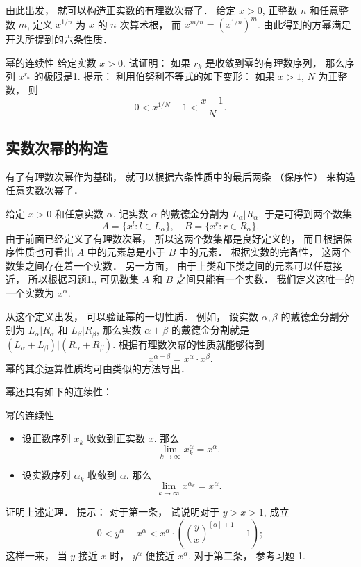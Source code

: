由此出发， 就可以构造正实数的有理数次幂了． 给定 $x>0$, 正整数 $n$ 和任意整数 $m$, 定义 $x^{1/n}$ 为 $x$ 的 $n$ 次算术根， 而 $x^{m/n}=(x^{1/n})^m$. 由此得到的方幂满足开头所提到的六条性质．

\begin{exercise}{幂的连续性}
给定实数 $x>0$. 试证明： 如果 $r_k$ 是收敛到零的有理数序列， 那么序列 $x^{r_k}$ 的极限是1. 提示： 利用伯努利不等式的如下变形： 如果 $x>1$, $N$ 为正整数， 则
\[
0<x^{1/N}-1<\frac{x-1}{N}.
\]
\end{exercise}

\subsection{实数次幂的构造}
有了有理数次幂作为基础， 就可以根据六条性质中的最后两条 （保序性） 来构造任意实数次幂了． 

给定 $x>0$ 和任意实数 $\alpha$. 记实数 $\alpha$ 的戴德金分割为 $L_\alpha|R_\alpha$. 于是可得到两个数集
\[
A=\{x^l:l\in L_\alpha\},\quad B=\{x^r:r\in R_\alpha\}.
\]
由于前面已经定义了有理数次幂， 所以这两个数集都是良好定义的， 而且根据保序性质也可看出 $A$ 中的元素总是小于 $B$ 中的元素． 根据实数的完备性， 这两个数集之间存在着一个实数． 另一方面， 由于上类和下类之间的元素可以任意接近， 所以根据习题1., 可见数集 $A$ 和 $B$ 之间只能有一个实数． 我们定义这唯一的一个实数为 $x^\alpha$.

从这个定义出发， 可以验证幂的一切性质． 例如， 设实数 $\alpha,\beta$ 的戴德金分割分别为 $L_\alpha|R_\alpha$ 和 $L_\beta|R_\beta$, 那么实数 $\alpha+\beta$ 的戴德金分割就是 $(L_\alpha+L_\beta)|(R_\alpha+R_\beta)$. 根据有理数次幂的性质就能够得到
\[
x^{\alpha+\beta}=x^\alpha\cdot x^\beta.
\]
幂的其余运算性质均可由类似的方法导出．

幂还具有如下的连续性：

\begin{theorem}{幂的连续性}
\begin{itemize}
\item 设正数序列 $x_k$ 收敛到正实数 $x$. 那么
\[
\lim_{k\to\infty}x_k^\alpha=x^\alpha.
\]
\item 设实数序列 $\alpha_k$ 收敛到 $\alpha$. 那么
\[
\lim_{k\to\infty}x^{\alpha_k}=x^\alpha.
\]
\end{itemize}
\end{theorem}

\begin{exercise}{}
证明上述定理． 提示： 对于第一条， 试说明对于 $y>x>1$, 成立
\[
0<y^\alpha-x^\alpha<x^\alpha\cdot\left(\left(\frac{y}{x}\right)^{[\alpha]+1}-1\right);
\]
这样一来， 当 $y$ 接近 $x$ 时， $y^\alpha$ 便接近 $x^\alpha$. 对于第二条， 参考习题 1.
\end{exercise}


